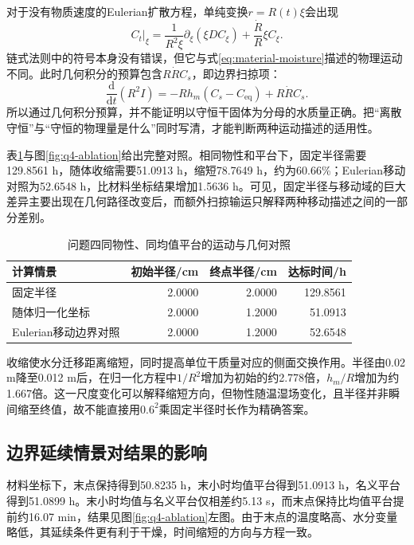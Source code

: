 对于没有物质速度的Eulerian扩散方程，单纯变换$r=R(t)\xi$会出现
\begin{equation}
 \left.C_t\right|_\xi
 =\frac1{R^2\xi}\partial_\xi(\xi D C_\xi)
  +\frac{\dot R}{R}\xi C_\xi.
 \label{eq:eulerian-comparison}
\end{equation}
链式法则中的符号本身没有错误，但它与式\eqref{eq:material-moisture}描述的物理运动不同。此时几何积分的预算包含$R\dot R C_s$，即边界扫掠项：
\begin{equation}
 \frac{\mathrm d}{\mathrm dt}(R^2I)
 =-Rh_m(C_s-C_{\mathrm{eq}})+R\dot R C_s.
 \label{eq:swept-budget}
\end{equation}
所以通过几何积分预算，并不能证明以守恒干固体为分母的水质量正确。把“离散守恒”与“守恒的物理量是什么”同时写清，才能判断两种运动描述的适用性。

表\ref{tab:ablation}与图\ref{fig:q4-ablation}给出完整对照。相同物性和平台下，固定半径需要129.8561 h，随体收缩需要51.0913 h，缩短78.7649 h，约为60.66\%；Eulerian移动对照为52.6548 h，比材料坐标结果增加1.5636 h。可见，固定半径与移动域的巨大差异主要出现在几何路径改变后，而额外扫掠输运只解释两种移动描述之间的一部分差别。

\begin{table}[htbp]
\centering\caption{问题四同物性、同均值平台的运动与几何对照}\label{tab:ablation}
\begin{tabular}{lrrr}\toprule
计算情景 & 初始半径/cm & 终点半径/cm & 达标时间/h\\\midrule
固定半径 & 2.0000 & 2.0000 & 129.8561\\
随体归一化坐标 & 2.0000 & 1.2000 & 51.0913\\
Eulerian移动边界对照 & 2.0000 & 1.2000 & 52.6548\\\bottomrule
\end{tabular}
\end{table}

收缩使水分迁移距离缩短，同时提高单位干质量对应的侧面交换作用。半径由0.02 m降至0.012 m后，在归一化方程中$1/R^2$增加为初始的约2.778倍，$h_m/R$增加为约1.667倍。这一尺度变化可以解释缩短方向，但物性随温湿场变化，且半径并非瞬间缩至终值，故不能直接用$0.6^2$乘固定半径时长作为精确答案。

\subsection{边界延续情景对结果的影响}
材料坐标下，末点保持得到50.8235 h，末小时均值平台得到51.0913 h，名义平台得到51.0899 h。末小时均值与名义平台仅相差约5.13 s，而末点保持比均值平台提前约16.07 min，结果见图\ref{fig:q4-ablation}左图。由于末点的温度略高、水分变量略低，其延续条件更有利于干燥，时间缩短的方向与方程一致。

